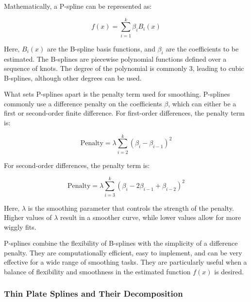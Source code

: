 \documentclass[12pt, twoside,hidelinks]{article}
\theoremstyle{definition}
\numberwithin{equation}{section}
\begin{document}
Mathematically, a P-spline can be represented as:

\[
f(x) = \sum_{i=1}^{k} \beta_i B_i(x)
\]

Here, \(B_i(x)\) are the B-spline basis functions, and \(\beta_i\) are the coefficients to be estimated. The B-splines are piecewise polynomial functions defined over a sequence of knots. The degree of the polynomial is commonly 3, leading to cubic B-splines, although other degrees can be used.


What sets P-splines apart is the penalty term used for smoothing. P-splines commonly use a difference penalty on the coefficients \(\beta\), which can either be a first or second-order finite difference. For first-order differences, the penalty term is:

\[
\text{Penalty} = \lambda \sum_{i=2}^{k} (\beta_i - \beta_{i-1})^2
\]

For second-order differences, the penalty term is:

\[
\text{Penalty} = \lambda \sum_{i=3}^{k} (\beta_i - 2\beta_{i-1} + \beta_{i-2})^2
\]

Here, \(\lambda\) is the smoothing parameter that controls the strength of the penalty. Higher values of \(\lambda\) result in a smoother curve, while lower values allow for more wiggly fits.




P-splines combine the flexibility of B-splines with the simplicity of a difference penalty. They are computationally efficient, easy to implement, and can be very effective for a wide range of smoothing tasks. They are particularly useful when a balance of flexibility and smoothness in the estimated function \(f(x)\) is desired.




\subsubsection{Thin Plate Splines and Their Decomposition}
\end{document}
